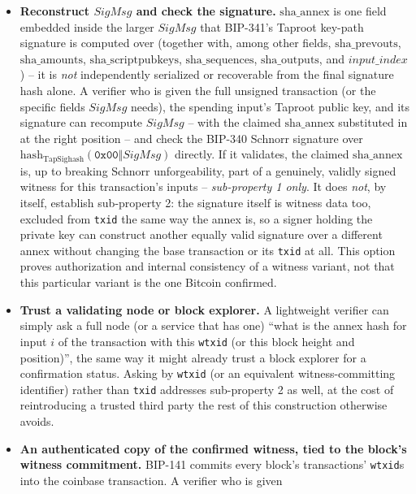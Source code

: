 \begin{itemize}
\item \textbf{Reconstruct $\mathit{SigMsg}$ and check the signature.}
  $\mathrm{sha\_annex}$ is one field embedded inside the larger
  $\mathit{SigMsg}$ that BIP-341's Taproot key-path signature is computed
  over (together with, among other fields, $\mathrm{sha\_prevouts}$,
  $\mathrm{sha\_amounts}$, $\mathrm{sha\_scriptpubkeys}$,
  $\mathrm{sha\_sequences}$, $\mathrm{sha\_outputs}$, and
  $\mathit{input\_index}$) -- it is \emph{not} independently serialized or
  recoverable from the final signature hash alone. A verifier who is given
  the full unsigned transaction (or the specific fields $\mathit{SigMsg}$
  needs), the spending input's Taproot public key, and its signature can
  recompute $\mathit{SigMsg}$ -- with the claimed $\mathrm{sha\_annex}$
  substituted in at the right position -- and check the BIP-340 Schnorr
  signature over $\mathrm{hash_{TapSighash}}(\mathtt{0x00} \Vert
  \mathit{SigMsg})$ directly. If it validates, the claimed
  $\mathrm{sha\_annex}$ is, up to breaking Schnorr unforgeability, part of
  a genuinely, validly signed witness for this transaction's inputs --
  \emph{sub-property 1 only}. It does \emph{not}, by itself, establish
  sub-property 2: the signature itself is witness data too, excluded from
  \texttt{txid} the same way the annex is, so a signer holding the private
  key can construct another equally valid signature over a different annex
  without changing the base transaction or its \texttt{txid} at all. This
  option proves authorization and internal consistency of a witness
  variant, not that this particular variant is the one Bitcoin confirmed.
\item \textbf{Trust a validating node or block explorer.} A lightweight
  verifier can simply ask a full node (or a service that has one) ``what is
  the annex hash for input $i$ of the transaction with this \texttt{wtxid}
  (or this block height and position)'', the same way it might already
  trust a block explorer for a confirmation status. Asking by
  \texttt{wtxid} (or an equivalent witness-committing identifier) rather
  than \texttt{txid} addresses sub-property 2 as well, at the cost of
  reintroducing a trusted third party the rest of this construction
  otherwise avoids.
\item \textbf{An authenticated copy of the confirmed witness, tied to the
  block's witness commitment.} BIP-141 commits every block's transactions'
  \texttt{wtxid}s into the coinbase transaction. A verifier who is given

\end{itemize}
